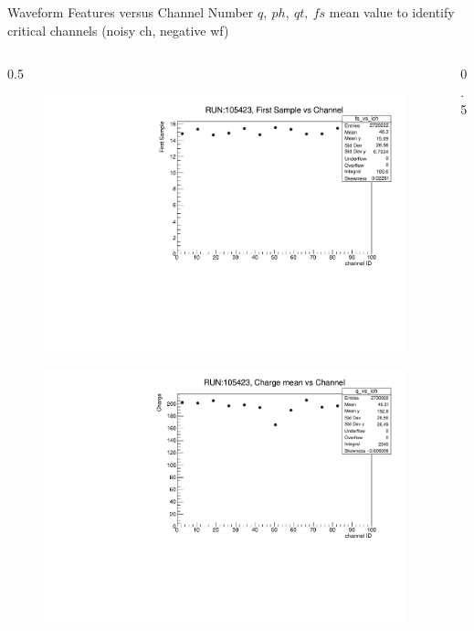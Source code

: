 \documentclass{beamer}[10pt]
\begin{document}
\begin{frame}{Waveform Features versus Channel Number}
$q, \ ph, \ qt, \ fs$ mean value to identify critical channels (noisy ch, negative wf)
\\
\vspace{-3mm}
\begin{columns}
\begin{column}{0.5\framewidth}
\begin{figure}[H]
   \centering
   \includegraphics[width= .90\columnwidth]{figures/pdf/fs_vs_ch.pdf}
   \label{fig:wffytl}
 \end{figure}
\vspace{-8mm}
\begin{figure}[H]
   \centering
   \includegraphics[width= .90\columnwidth]{figures/pdf/q_vs_ch.pdf}
   \label{fig:wffytl}
 \end{figure}
\end{column}
\begin{column}{0.5\framewidth}

\end{column}
\end{columns}
\end{frame}
\end{document}
